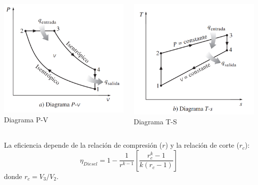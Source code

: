 \documentclass{beamer}
\begin{document}
\begin{frame}
    \begin{columns}[T]
        \begin{column}{0.5\textwidth}
            \centering
            \includegraphics[width=\textwidth]{Diagrama-PV-Diesel.png}
            \tiny{Diagrama P-V}
        \end{column}
        \begin{column}{0.5\textwidth}
            \centering
            \includegraphics[width=\textwidth]{diagrama-TS-Diesel.png}
            \tiny{Diagrama T-S}
        \end{column}
    \end{columns}
    
    \vspace{0.5cm}
    La eficiencia depende de la relación de compresión ($r$) y la relación de corte ($r_c$):
    $$ \eta_{Diesel} = 1 - \frac{1}{r^{k-1}} \left[ \frac{r_c^k - 1}{k(r_c - 1)} \right] $$
    donde $r_c = V_3 / V_2$.
\end{frame}
\end{document}
